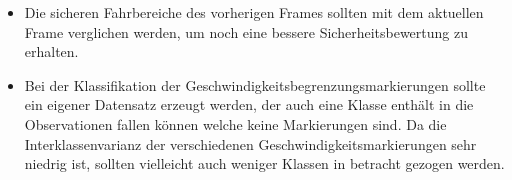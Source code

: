 \begin{itemize}
\item Die sicheren Fahrbereiche des vorherigen Frames sollten mit dem aktuellen Frame verglichen werden, um noch eine bessere Sicherheitsbewertung zu erhalten.

\item Bei der Klassifikation der Geschwindigkeitsbegrenzungsmarkierungen sollte ein eigener Datensatz erzeugt werden, der auch eine Klasse enth\"alt in die Observationen fallen k\"onnen welche keine Markierungen sind. Da die Interklassenvarianz der verschiedenen Geschwindigkeitsmarkierungen sehr niedrig ist, sollten vielleicht auch weniger Klassen in betracht gezogen werden.

\end{itemize}



